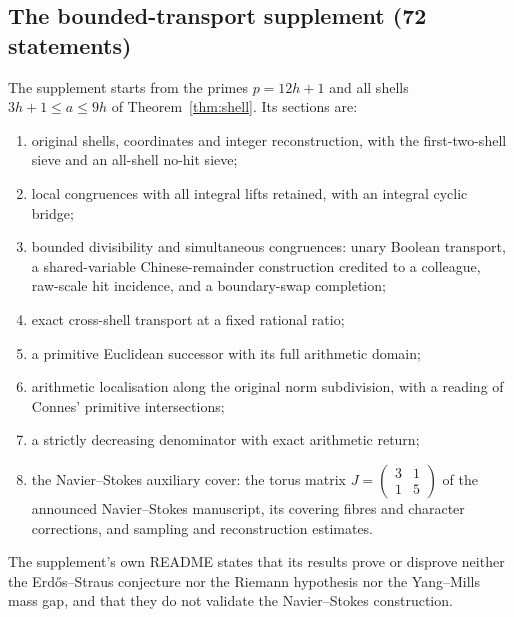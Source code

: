 \subsection{The bounded-transport supplement (72 statements)}\label{ssec:supplement}

The supplement starts from the primes $p=12h+1$ and all shells $3h+1\le a\le9h$ of Theorem~\ref{thm:shell}. Its sections are:
\begin{enumerate}[label=\arabic*.]
\item original shells, coordinates and integer reconstruction, with the first-two-shell sieve and an all-shell no-hit sieve;
\item local congruences with all integral lifts retained, with an integral cyclic bridge;
\item bounded divisibility and simultaneous congruences: unary Boolean transport, a shared-variable Chinese-remainder construction credited to a colleague, raw-scale hit incidence, and a boundary-swap completion;
\item exact cross-shell transport at a fixed rational ratio;
\item a primitive Euclidean successor with its full arithmetic domain;
\item arithmetic localisation along the original norm subdivision, with a reading of Connes' primitive intersections;
\item a strictly decreasing denominator with exact arithmetic return;
\item the Navier--Stokes auxiliary cover: the torus matrix $J=\begin{pmatrix}3&1\\1&5\end{pmatrix}$ of the announced Navier--Stokes manuscript, its covering fibres and character corrections, and sampling and reconstruction estimates.
\end{enumerate}
The supplement's own README states that its results prove or disprove neither the Erdős--Straus conjecture nor the Riemann hypothesis nor the Yang--Mills mass gap, and that they do not validate the Navier--Stokes construction.

